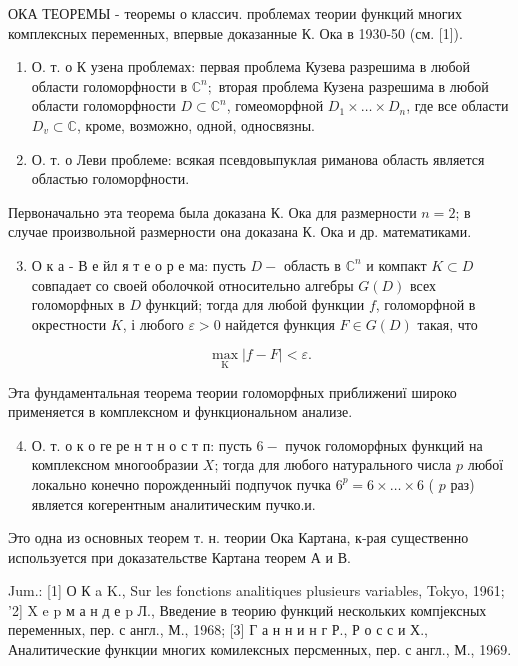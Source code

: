 \documentclass[10pt]{article}
\begin{document}
ОКА ТЕОРЕМЫ - теоремы о классич. проблемах теории функций многих комплексных переменных, впервые доказанные К. Ока в 1930-50 (см. [1]).

\begin{enumerate}
  \item О. т. о К узена проблемах: первая проблема Кузева разрешима в любой области голоморфности в $\mathbb{C}^{n} ;$ вторая проблема Кузена разрешима в любой области голоморфности $D \subset \mathbb{C}^{n}$, гомеоморфной $D_{1} \times \ldots \times D_{n}$, где все области $D_{v} \subset \mathbb{C}$, кроме, возможно, одной, односвязны.

  \item О. т. о Леви проблеме: всякая псевдовыпуклая риманова область является областью голоморфности.

\end{enumerate}

Первоначально эта теорема была доказана К. Ока для размерности $n=2$; в случае произвольной размерности она доказана К. Ока и др. математиками.

\begin{enumerate}
  \setcounter{enumi}{2}
  \item О к а - В е йл я т е о р е ма: пусть $D-$ область в $\mathbb{C}^{n}$ и компакт $K \subset D$ совпадает со своей оболочкой относительно алгебры $G(D)$ всех голоморфных в $D$ функций; тогда для любой функции $f$, голоморфной в окрестности $K$, і любого $\varepsilon>0$ найдется функция $F \in G(D)$ такая, что
\end{enumerate}

\[
\max _{\mathrm{K}}|f-F|<\varepsilon .
\]

Эта фундаментальная теорема теории голоморфных приближениї широко применяется в комплексном и функциональном анализе.

\begin{enumerate}
  \setcounter{enumi}{3}
  \item О. т. о к о ге ре н т н о с т п: пусть $6-$ пучок голоморфных функций на комплексном многообразии $X$; тогда для любого натурального числа $p$ любої локально конечно порожденныйі подпучок пучка $6^{p}=6 \times \ldots \times 6$ ( $p$ раз) является когерентным аналитическим пучко.и.
\end{enumerate}

Это одна из основных теорем т. н. теории Ока Картана, к-рая существенно используется при доказательстве Картана теорем А и В.

Jum.: [1] О К a K., Sur les fonctions analitiques plusieurs variables, Tokyo, 1961; '2] X e p м а н д е p Л., Введение в теорию функций нескольких компјексных переменных, пер. с англ., М., 1968; [3] Г а н н и н г Р., Р о с с и Х., Аналитические функции многих комилексных персменных, пер. с англ., М., 1969.
\end{document}
